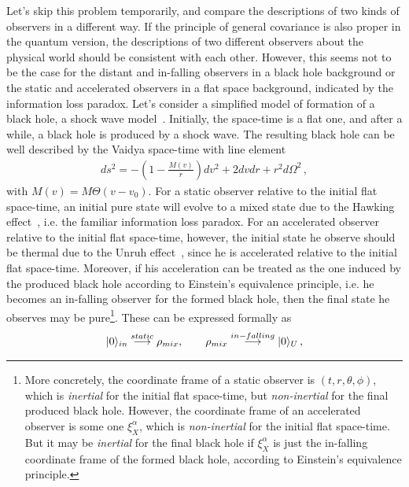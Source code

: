 \documentclass[12pt,a4paper]{article}
\begin{document}
Let's skip this problem temporarily, and compare the descriptions of two kinds of observers in a different way. If the principle of general covariance is also proper in the quantum version, the descriptions of two different observers about the physical world should be consistent with each other. However, this seems not to be the case for the distant and in-falling observers in a black hole background or the static and accelerated observers in a flat space background, indicated by the information loss paradox. Let's consider a simplified model of formation of a black hole, a shock wave model~\cite{j}. Initially, the space-time is a flat one, and after a while, a black hole is produced by a shock wave. The resulting black hole can be well described by the Vaidya space-time with line element~\cite{j}
\begin{equation}
\label{eq:a}
\begin{split}
ds^2=-(1-\frac{M(v)}{r})dv^2+2dvdr+r^2d\Omega^2\,,
\end{split}
\end{equation}
with $M(v)=M\Theta(v-v_0)$. For a static observer relative to the initial flat space-time, an initial pure state will evolve to a mixed state due to the Hawking effect~\cite{a}, i.e. the familiar information loss paradox. For an accelerated observer relative to the initial flat space-time, however, the initial state he observe should be thermal due to the Unruh effect~\cite{j1}, since he is accelerated relative to the initial flat space-time. Moreover, if his acceleration can be treated as the one induced by the produced black hole according to Einstein's equivalence principle, i.e. he becomes an in-falling observer for the formed black hole, then the final state he observes may be pure\footnote{More concretely, the coordinate frame of a static observer is $(t,r,\theta,\phi)$, which is \emph{inertial} for the initial flat space-time, but \emph{non-inertial} for the final produced black hole. However, the coordinate frame of an accelerated observer is some one $\xi^{\alpha}_{X}$, which is \emph{non-inertial} for the initial flat space-time. But it may be \emph{inertial} for the final black hole if $\xi^{\alpha}_{X}$ is just the in-falling coordinate frame of the formed black hole, according to Einstein's equivalence principle.}. These can be expressed formally as
\begin{equation}
\label{eq:b}
\begin{split}
\arrowvert
0\rangle_{in}\stackrel{static}{\longrightarrow}\rho_{mix},\qquad \rho_{mix}\stackrel{in-falling}{\longrightarrow}\arrowvert
0\rangle_{U}\,,
\end{split}
\end{equation}
\end{document}
